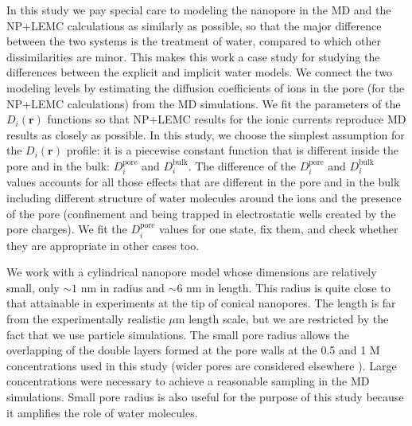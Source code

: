 \documentclass[fleqn,10pt]{SelfArx} %
\begin{document}
In this study we pay special care to modeling the nanopore in the MD and the NP+LEMC calculations as similarly as possible, so that the major difference between the two systems is the treatment of water, compared to which other dissimilarities are minor. 
This makes this work a case study for studying the differences between the explicit and implicit water models.
We connect the two modeling levels by estimating the diffusion coefficients of ions in the pore (for the NP+LEMC calculations) from the MD simulations.
We fit the parameters of the $D_{i}(\mathbf{r})$ functions so that NP+LEMC results for the ionic currents reproduce MD results as closely as possible.
In this study, we choose the simplest assumption for the $D_{i}(\mathbf{r})$ profile: it is a piecewise constant function that is different inside the pore and in the bulk: $D_{i}^{\mathrm{pore}}$ and $D_{i}^{\mathrm{bulk}}$. 
The difference of the $D_{i}^{\mathrm{pore}}$ and $D_{i}^{\mathrm{bulk}}$ values accounts for all those effects that are different in the pore and in the bulk including different structure of water molecules around the ions and the presence of the pore (confinement and being trapped in electrostatic wells created by the pore charges).
We fit the $D_{i}^{\mathrm{pore}}$ values for one state, fix them, and check whether they are appropriate in other cases too.

We work with a cylindrical nanopore model whose dimensions are relatively small, only $\sim 1$ nm in radius and $\sim 6$ nm in length. 
This radius is quite close to that attainable in experiments at the tip of conical nanopores. 
The length is far from the experimentally realistic $\mu$m length scale, but we are restricted by the fact that we use particle simulations. 
The small pore radius allows the overlapping of the double layers formed at the pore walls at the 0.5 and 1 M concentrations used in this study (wider pores are considered elsewhere \cite{matejczyk-jcp-submitted-2017}).
Large concentrations were necessary to achieve a reasonable sampling in the MD simulations.
Small pore radius is also useful for the purpose of this study because it amplifies the role of water molecules.
\end{document}
